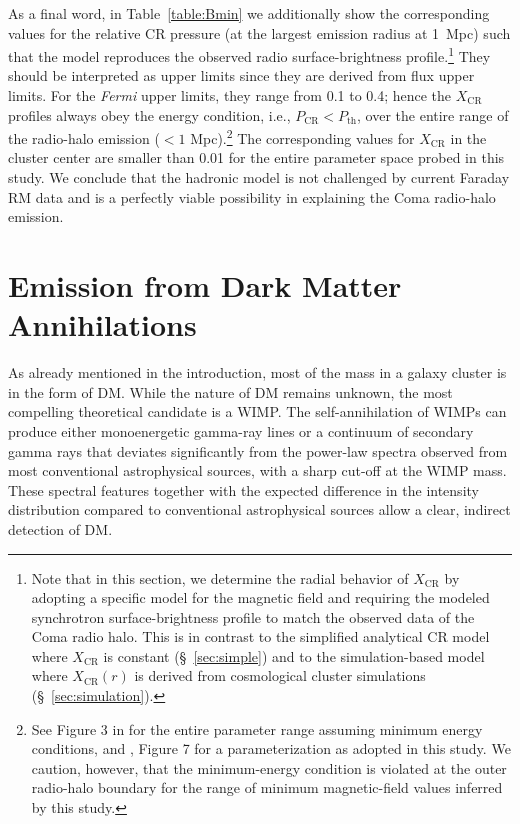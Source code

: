 \documentclass[12pt,manuscript]{aastex}
\def\Fermi{{\em Fermi}\xspace}
\newcommand{\CR}{\mathrm{CR}}
\begin{document}
As a final word, in Table~\ref{table:Bmin} we additionally show the corresponding values for the
relative CR pressure (at the largest emission radius at 1~Mpc) such that the model reproduces the
observed radio surface-brightness profile.\footnote{Note that in this section, we determine the
radial behavior of $X_\CR$ by adopting a specific model for the magnetic field and requiring the
modeled synchrotron surface-brightness profile to match the observed data of the Coma radio
halo. This is in contrast to the simplified analytical CR model where $X_\CR$ is constant
(\S~\ref{sec:simple}) and to the simulation-based model where $X_\CR(r)$ is derived from
cosmological cluster simulations (\S~\ref{sec:simulation}).} They should be interpreted as upper
limits since they are derived from flux upper limits. For the \Fermi upper limits, they range
from 0.1 to 0.4; hence the $X_{\CR}$ profiles always obey the energy condition, i.e., $P_{\CR} <
P_{\mathrm{th}}$, over the entire range of the radio-halo emission ($< 1$ Mpc).\footnote{See Figure 3
in \citet{article:PfrommerEnsslin:2004a} for the entire parameter range assuming minimum energy
conditions, and \citet{article:PfrommerEnsslin:2004b}, Figure 7 for a parameterization as adopted in
this study. We caution, however, that the minimum-energy condition is violated at the outer
radio-halo boundary for the range of minimum magnetic-field values inferred by this study.} The
corresponding values for $X_\CR$ in the cluster center are smaller than 0.01 for the entire
parameter space probed in this study. We conclude that the hadronic model is not challenged by
current Faraday RM data and is a perfectly viable possibility in explaining the Coma radio-halo
emission.

%
%

\section{Emission from Dark Matter Annihilations}
As already mentioned in the introduction, most of the mass in a galaxy cluster is in the form of
DM. While the nature of DM remains unknown, the most compelling theoretical candidate is a
WIMP. The self-annihilation of WIMPs can produce either monoenergetic gamma-ray lines or a
continuum of secondary gamma rays that deviates significantly from the power-law spectra observed
from most conventional astrophysical sources, with a sharp cut-off at the WIMP mass. These spectral
features together with the expected difference in the intensity distribution compared to
conventional astrophysical sources allow a clear, indirect detection of DM.
\end{document}
